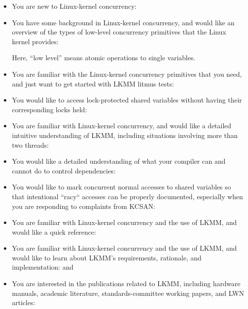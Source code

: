 \begin{itemize}
  \item You are new to Linux-kernel concurrency:

  \item You have some background in Linux-kernel concurrency, and would
	like an overview of the types of low-level concurrency primitives
	that the Linux kernel provides:

	Here, ``low level'' means atomic operations to single variables.

  \item You are familiar with the Linux-kernel concurrency primitives
	that you need, and just want to get started with LKMM litmus
	tests:

  \item You would like to access lock-protected shared variables without
	having their corresponding locks held:

  \item You are familiar with Linux-kernel concurrency, and would
	like a detailed intuitive understanding of LKMM, including
	situations involving more than two threads:

  \item You would like a detailed understanding of what your compiler can
	and cannot do to control dependencies:

  \item You would like to mark concurrent normal accesses to shared
	variables so that intentional ``racy`` accesses can be properly
	documented, especially when you are responding to complaints
	from KCSAN\@:

  \item You are familiar with Linux-kernel concurrency and the use of
	LKMM, and would like a quick reference:

  \item You are familiar with Linux-kernel concurrency and the use
	of LKMM, and would like to learn about LKMM's requirements,
	rationale, and implementation:
	 and 

  \item You are interested in the publications related to LKMM, including
	hardware manuals, academic literature, standards-committee
	working papers, and LWN articles:
\end{itemize}


